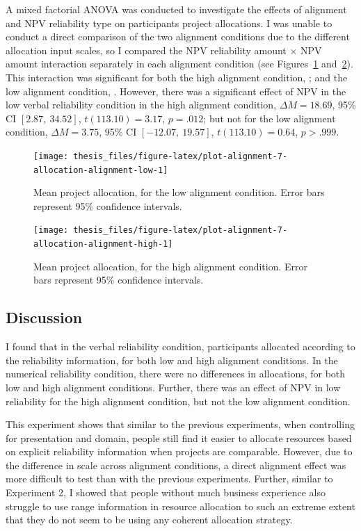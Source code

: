 \documentclass[a4paper, nobind, dvipsnames]{templates/ociamthesis}
\theoremstyle{definition}
\theoremstyle{definition}
\theoremstyle{definition}
\theoremstyle{definition}
\theoremstyle{remark}
\begin{document}
A mixed factorial ANOVA was conducted to investigate the effects of alignment
and NPV reliability type on participants project allocations. I was unable to
conduct a direct comparison of the two alignment conditions due to the different
allocation input scales, so I compared the NPV reliability amount \(\times\) NPV
amount interaction separately in each alignment condition (see
Figures~\ref{fig:plot-alignment-7-allocation-alignment-low}
and~\ref{fig:plot-alignment-7-allocation-alignment-high}). This interaction was
significant for both the high alignment condition,
;
and the low alignment condition,
.
However, there was a significant effect of NPV in the low verbal reliability
condition in the high alignment condition,
\(\Delta M = 18.69\), 95\% CI \([2.87,~34.52]\), \(t(113.10) = 3.17\), \(p = .012\); but not
for the low alignment condition,
\(\Delta M = 3.75\), 95\% CI \([-12.07,~19.57]\), \(t(113.10) = 0.64\), \(p > .999\).



\begin{figure}
\texttt{[image: thesis\_files/figure-latex/plot-alignment-7-allocation-alignment-low-1]} \caption{Mean project allocation, for the low alignment condition. Error bars represent 95\% confidence intervals.}\label{fig:plot-alignment-7-allocation-alignment-low}
\end{figure}



\begin{figure}
\texttt{[image: thesis\_files/figure-latex/plot-alignment-7-allocation-alignment-high-1]} \caption{Mean project allocation, for the high alignment condition. Error bars represent 95\% confidence intervals.}\label{fig:plot-alignment-7-allocation-alignment-high}
\end{figure}

\subsection{Discussion}

I found that in the verbal reliability condition, participants allocated
according to the reliability information, for both low and high alignment
conditions. In the numerical reliability condition, there were no differences in
allocations, for both low and high alignment conditions. Further, there was an
effect of NPV in low reliability for the high alignment condition, but not the
low alignment condition.

This experiment shows that similar to the previous experiments, when controlling
for presentation and domain, people still find it easier to allocate resources
based on explicit reliability information when projects are comparable. However,
due to the difference in scale across alignment conditions, a direct alignment
effect was more difficult to test than with the previous experiments. Further,
similar to Experiment 2, I showed that people without much business experience
also struggle to use range information in resource allocation to such an extreme
extent that they do not seem to be using any coherent allocation strategy.
\end{document}
